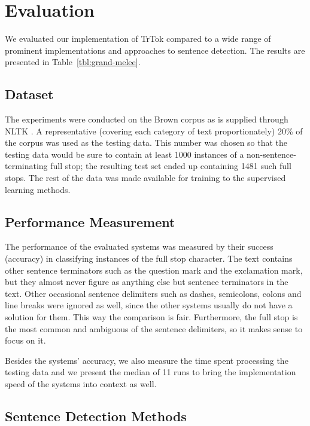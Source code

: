 \section{Evaluation}
\label{sec:eval}

We evaluated our implementation of TrTok compared to a wide range of
prominent implementations and approaches to sentence detection. The
results are presented in Table~\ref{tbl:grand-melee}.

\subsection{Dataset}

The experiments were conducted on the Brown corpus \cite{data-brown}
as is supplied through NLTK \cite{software-nltk}. A representative
(covering each category of text proportionately) 20\% of the corpus
was used as the testing data. This number was chosen so that the
testing data would be sure to contain at least 1000 instances of a
non-sentence-terminating full stop; the resulting test set ended up
containing 1481 such full stops. The rest of the data was made
available for training to the supervised learning methods.

\subsection{Performance Measurement}

The performance of the evaluated systems was measured by their success
(accuracy) in classifying instances of the full stop character. The
text contains other sentence terminators such as the question mark and
the exclamation mark, but they almost never figure as anything else
but sentence terminators in the text. Other occasional sentence
delimiters such as dashes, semicolons, colons and line breaks were
ignored as well, since the other systems usually do not have a
solution for them. This way the comparison is fair. Furthermore, the
full stop is the most common and ambiguous of the sentence delimiters,
so it makes sense to focus on it.

Besides the systems' accuracy, we also measure the time spent
processing the testing data and we present the median of 11 runs to
bring the implementation speed of the systems into context as well.

\subsection{Sentence Detection Methods}

